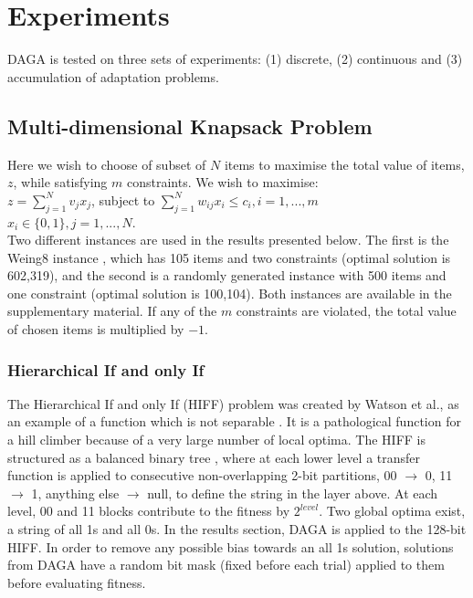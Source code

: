 \documentclass[twoside]{article}
\begin{document}
\section{Experiments}
\label{sec:experiments}
DAGA is tested on three sets of experiments: (1) discrete, (2) continuous and (3) accumulation of adaptation problems. 

\subsection{Multi-dimensional Knapsack Problem}
Here we wish to choose of subset of \(N\) items to maximise the total value of items, \(z\), while satisfying \(m\) constraints. We wish to maximise:
\vspace{2mm}\\
\(z = \sum_{j=1}^{N} v_jx_j\), subject to \(\sum_{j=1}^{N} w_{ij}x_i \leq c_i, i = 1, ..., m\)
\vspace{2mm}\\
\(x_i \in \{0,1\}, j = 1, ..., N\).
\vspace{2mm}\\
Two different instances are used in the results presented below. The first is the Weing8 instance \cite{ref}, which has 105 items and two constraints (optimal solution is 602,319), and the second is a randomly generated instance with 500 items and one constraint (optimal solution is 100,104). Both instances are available in the supplementary material. If any of the \(m\) constraints are violated, the total value of chosen items is multiplied by \(-1\).
\subsubsection{Hierarchical If and only If}
The Hierarchical If and only If (HIFF) problem was created by Watson et al., as an example of a function which is not separable \cite{ref}. It is a pathological function for a hill climber because of a very large number of local optima. The HIFF is structured as a balanced binary tree \cite{hboa}, where at each lower level a transfer function is applied to consecutive non-overlapping 2-bit partitions, 00 \(\rightarrow\) 0, 11 \(\rightarrow\) 1, anything else \(\rightarrow\) null, to define the string in the layer above. At each level, 00 and 11 blocks contribute to the fitness by \(2^{level}\). Two global optima exist, a string of all 1s and all 0s. In the results section, DAGA is applied to the 128-bit HIFF. In order to remove any possible bias towards an all 1s solution, solutions from DAGA have a random bit mask (fixed before each trial) applied to them before evaluating fitness.
\end{document}
